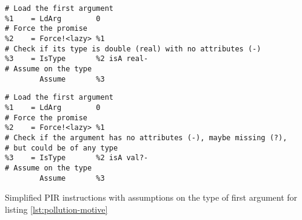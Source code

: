 \begin{listing}
	\begin{sublisting}{\textwidth}
		\begin{verbatim}
# Load the first argument
%1    = LdArg        0
# Force the promise
%2    = Force!<lazy> %1
# Check if its type is double (real) with no attributes (-)
%3    = IsType       %2 isA real-
# Assume on the type
        Assume       %3
    \end{verbatim}
		\label{lst:pollution-pir-real}
	\end{sublisting}

	\vspace{1em}

	\begin{sublisting}{\textwidth}
		\begin{verbatim}
# Load the first argument
%1    = LdArg        0
# Force the promise
%2    = Force!<lazy> %1
# Check if the argument has no attributes (-), maybe missing (?),
# but could be of any type
%3    = IsType       %2 isA val?-
# Assume on the type
        Assume       %3
    \end{verbatim}
		\label{lst:pollution-pir-val}
	\end{sublisting}
	\caption{Simplified PIR instructions with assumptions on the type of first argument for listing \ref{lst:pollution-motive}}
\end{listing}

